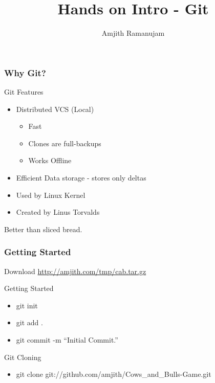 \documentclass[10pt]{beamer}
\title{Hands on Intro - Git}
\author{Amjith Ramanujam}
\institute{twitter: amjith\_\\
blog: amjith.blogspot.com}
\date{}
\begin{document}
\begin{frame}
    \titlepage
\end{frame}

\begin{frame}
    \frametitle{Why Git?}
    \begin{block}{Git Features}
        \begin{itemize}
            \item Distributed VCS (Local)\\
            \begin{itemize}
                \item Fast\\
                \item Clones are full-backups\\
                \item Works Offline
            \end{itemize}
            \item Efficient Data storage - stores only deltas
            \item Used by Linux Kernel
            \item Created by Linus Torvalds
        \end{itemize}
    \end{block}
    \pause
    Better than sliced bread.
\end{frame}

\begin{frame}
    \frametitle{Getting Started}
    Download \url{http://amjith.com/tmp/cab.tar.gz}
    \begin{block}{Getting Started}
        \begin{itemize}
            \item git init \\
            \item git add .\\
            \item git commit -m ``Initial Commit.''
        \end{itemize}
    \end{block}
    \pause
    \begin{block}{Git Cloning}
        \begin{itemize}
		\item git clone git://github.com/amjith/Cows\_and\_Bulls-Game.git
        \end{itemize}
    \end{block}
\end{frame}
\end{document}
